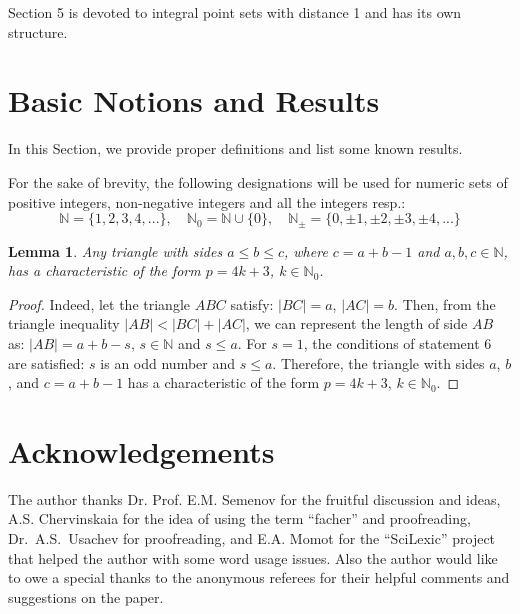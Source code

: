 \documentclass[a4paper,14pt]{article} %
\theoremstyle{plain}
\newtheorem{lemma}[theorem]{Lemma}
\theoremstyle{definition}
\begin{document}
Section 5 is devoted to integral point sets with distance 1 and has its own structure.



\section{Basic Notions and Results}

In this Section, we provide proper definitions and list some known results.

For the sake of brevity, the following designations will be used for numeric sets
of positive integers, non-negative integers and all the integers resp.:
\begin{equation}
	\mathbb{N} = \{1,2,3,4,...\},\quad \mathbb{N}_0 = \mathbb{N} \cup \{0\},
	\quad
	\mathbb{N}_\pm = \{0,\pm 1,\pm 2,\pm 3,\pm 4,...\}
\end{equation}


\begin{lemma}
	\label{lem:triangle_4k_plus_3}
	Any triangle with sides $a \leq b \leq c$, where $c=a+b-1$ and $a, b, c \in \mathbb{N}$,
	has a characteristic of the form $p=4k+3$, $k\in \mathbb{N}_0$.
\end{lemma}

\begin{proof}
	Indeed, let the triangle $ABC$ satisfy: $|BC|=a$, $|AC|=b$. Then, from the triangle inequality $|AB| < |BC|+|AC|$, we can represent the length of side $AB$ as: $|AB|=a+b-s$, $s \in \mathbb{N}$ and $s \leq a$. For $s=1$, the conditions of statement 6 are satisfied: $s$ is an odd number and $s \leq a$.
	Therefore, the triangle with sides $a$, $b$, and $c=a+b-1$ has a characteristic of the form $p=4k+3$, $k\in \mathbb{N}_0$.
\end{proof}




\section{Acknowledgements}
The author thanks Dr. Prof. E.M. Semenov for the fruitful discussion and ideas,
A.S. Chervinskaia for the idea of using the term ``facher'' and proofreading,
Dr.~A.S.~Usachev for proofreading,
and E.A. Momot for the ``SciLexic'' project that helped the author with some word usage issues.
Also the author would like to owe a special thanks to the anonymous referees
for their helpful comments and suggestions on the paper.


\printbibliography
\end{document}
